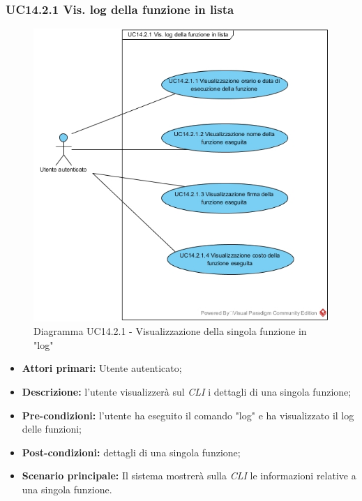 \subsubsection{UC14.2.1 Vis. log della funzione in lista}
\begin{figure}[h]
	\centering
	\includegraphics[width=0.7\linewidth]{res/img/UC14.2.1.jpg}
	\caption{Diagramma UC14.2.1 - Visualizzazione della singola funzione in "log"}
\end{figure}
\begin{itemize}
	\item \textbf{Attori primari:} Utente autenticato;
	\item \textbf{Descrizione:} l'utente visualizzerà sul \textit{CLI\glo} i dettagli di una singola funzione;
	\item \textbf{Pre-condizioni:} l'utente ha eseguito il comando "log" e ha visualizzato il log delle funzioni;
	\item \textbf{Post-condizioni:} dettagli di una singola funzione;
	\item \textbf{Scenario principale:} Il sistema mostrerà sulla \textit{CLI\glo} le informazioni relative a una singola funzione.
\end{itemize}
